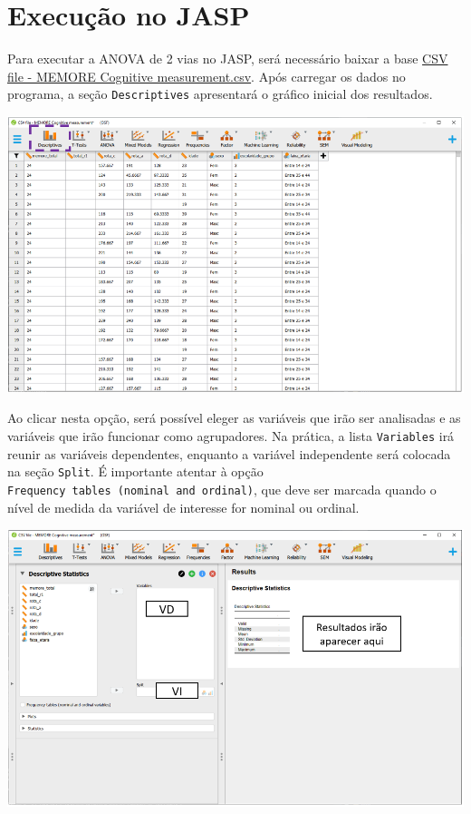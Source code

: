 \documentclass[
]{book}
\begin{document}
\hypertarget{execuuxe7uxe3o-no-jasp-8}{%
\section{Execução no JASP}\label{execuuxe7uxe3o-no-jasp-8}}

Para executar a ANOVA de 2 vias no JASP, será necessário baixar a base \href{https://osf.io/4hdc2/}{CSV file - MEMORE Cognitive measurement.csv}. Após carregar os dados no programa, a seção \texttt{Descriptives} apresentará o gráfico inicial dos resultados.

\includegraphics{./img/cap_anova_two_way_descriptives.png}

Ao clicar nesta opção, será possível eleger as variáveis que irão ser analisadas e as variáveis que irão funcionar como agrupadores. Na prática, a lista \texttt{Variables} irá reunir as variáveis dependentes, enquanto a variável independente será colocada na seção \texttt{Split}. É importante atentar à opção \texttt{Frequency\ tables\ (nominal\ and\ ordinal)}, que deve ser marcada quando o nível de medida da variável de interesse for nominal ou ordinal.

\includegraphics{./img/cap_anova_two_way_descriptives2.png}
\end{document}
